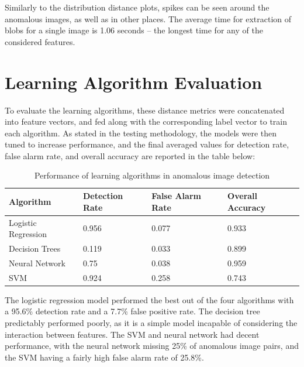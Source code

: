 Similarly to the distribution distance plots, spikes can be seen around the anomalous images, as well as in other places.
The average time for extraction of blobs for a single image is 1.06 seconds -- the longest time for any of the considered features.

\section{Learning Algorithm Evaluation}

To evaluate the learning algorithms, these distance metrics were concatenated into feature vectors, and fed along with the corresponding label vector to train each algorithm.
As stated in the testing methodology, the models were then tuned to increase performance, and the final averaged values for detection rate, false alarm rate, and overall accuracy are reported in the table below:

\begin{table}[h!]
	\centering
	\begin{tabular}{|l|l|l|l|}
		\hline
		Algorithm & Detection Rate & False Alarm Rate & Overall Accuracy  \\ \hline
		Logistic Regression & 0.956 & 0.077 & 0.933  \\ \hline
		Decision Trees & 0.119 & 0.033 & 0.899  \\ \hline
		Neural Network & 0.75 & 0.038 & 0.959  \\ \hline
		SVM & 0.924 & 0.258  & 0.743 \\ \hline
	\end{tabular}
	\caption{Performance of learning algorithms in anomalous image detection}
\end{table}


The logistic regression model performed the best out of the four algorithms with a 95.6\% detection rate and a 7.7\% false positive rate.
The decision tree predictably performed poorly, as it is a simple model incapable of considering the interaction between features.
The SVM and neural network had decent performance, with the neural network missing 25\% of anomalous image pairs, and the SVM having a fairly high false alarm rate of 25.8\%.




